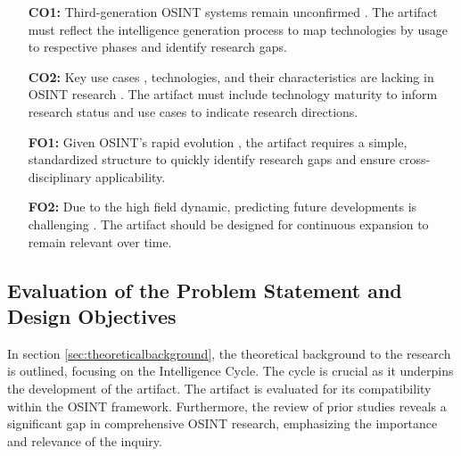 \documentclass[10pt]{article}
\begin{document}
\begin{itemize}
    \item[\textbf{CO1:}] Third-generation OSINT systems remain unconfirmed \cite{Ghioni.2023}. The artifact must reflect the intelligence generation process to map technologies by usage to respective phases and identify research gaps.
    \item[\textbf{CO2:}] Key use cases \cite{AlKilani.2021, Dokman.2020, Ghioni.2023}, technologies, and their characteristics are lacking in OSINT research \cite{Ghioni.2023,Ish.2022}. The artifact must include technology maturity to inform research status and use cases to indicate research directions.
    \item[\textbf{FO1:}] Given OSINT's rapid evolution \cite{Ghioni.2023}, the artifact requires a simple, standardized structure to quickly identify research gaps and ensure cross-disciplinary applicability.
    \item[\textbf{FO2:}] Due to the high field dynamic, predicting future developments is challenging \cite{Benes.2013}. The artifact should be designed for continuous expansion to remain relevant over time.
\end{itemize}

\subsection{Evaluation of the Problem Statement and Design Objectives} \label{sec:eval}
In section \ref{sec:theoreticalbackground}, the theoretical background to the research is outlined, focusing on the Intelligence Cycle. The cycle is crucial as it underpins the development of the artifact. The artifact is evaluated for its compatibility within the OSINT framework. Furthermore, the review of prior studies reveals a significant gap in comprehensive OSINT research, emphasizing the importance and relevance of the inquiry.
\end{document}
